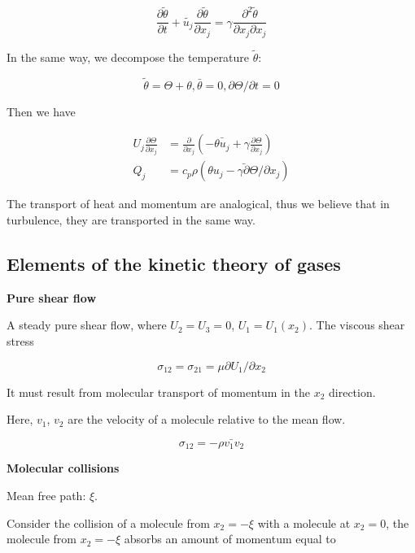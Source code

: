 \documentclass{article}
\begin{document}
\begin{equation*}
    \frac{\partial\tilde\theta}{\partial t}+\tilde{u_j}\frac{\partial\tilde\theta}{\partial x_j}=\gamma\frac{\partial^2\tilde{\theta}}{\partial x_j\partial x_j}
\end{equation*}

In the same way, we decompose the temperature $\tilde\theta$:

\begin{equation*}
    \tilde\theta=\Theta+\theta, \bar\theta=0, \partial\Theta / \partial t=0
\end{equation*}

Then we have

\begin{align*}
    U_j\frac{\partial\Theta}{\partial x_j} & =\frac{\partial}{\partial x_j}\left(-\bar{\theta u_j}+\gamma\frac{\partial\Theta}{\partial x_j}\right) \\
    Q_j                                    & =c_p\rho\left(\bar{\theta u_j-\gamma\partial\Theta / \partial x_j}\right)
\end{align*}

The transport of heat and momentum are analogical, thus we believe that in turbulence, they are transported in the same way.

\subsection{Elements of the kinetic theory of gases}

\textbf{Pure shear flow}

A steady pure shear flow, where $U_2=U_3=0$, $U_1=U_1(x_2)$. The viscous shear stress

\begin{equation*}
    \sigma_{12}=\sigma_{21}=\mu\partial U_1/\partial x_2
\end{equation*}

It must result from molecular transport of momentum  in the $x_2$ direction.

Here, $v_1$, $v_2$ are the velocity of a molecule relative to the mean flow.

\begin{equation*}
    \sigma_{12}=-\bar{\rho v_1 v_2}
\end{equation*}

\textbf{Molecular collisions}

Mean free path: $\xi$.

Consider the collision of a molecule from $x_2=-\xi$ with a molecule at $x_2=0$, the molecule from $x_2=-\xi$ absorbs an amount of momentum equal to 
\end{document}
